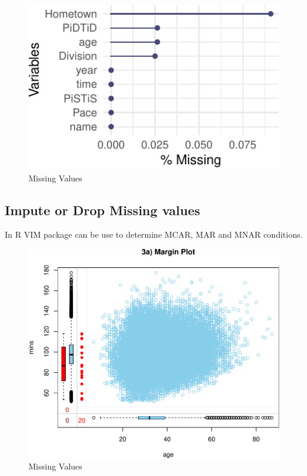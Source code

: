 \documentclass[
]{article}
\begin{document}
\begin{figure}[H]

{\centering \includegraphics{case_study02_files/figure-latex/unnamed-chunk-6-1} 

}

\caption{Missing Values}\label{fig:unnamed-chunk-6}
\end{figure}

\hypertarget{impute-or-drop-missing-values}{%
\subsection{Impute or Drop Missing
values}\label{impute-or-drop-missing-values}}

In R VIM package can be use to determine MCAR, MAR and MNAR conditions.

\begin{figure}[H]

{\centering \includegraphics{case_study02_files/figure-latex/unnamed-chunk-7-1} 

}

\caption{Missing Values}\label{fig:unnamed-chunk-7}
\end{figure}
\end{document}
